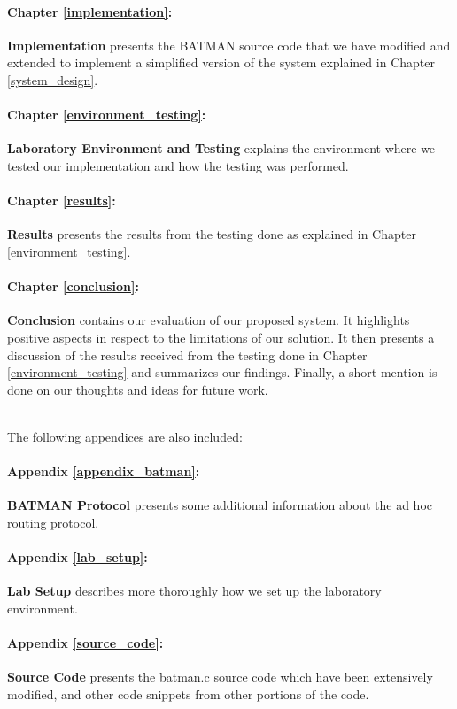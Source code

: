 \paragraph{Chapter \ref{implementation}:}\textbf{Implementation} presents the BATMAN source code that we have modified and extended to implement a simplified version of the system explained in Chapter \ref{system_design}.

\paragraph{Chapter \ref{environment_testing}:}\textbf{Laboratory Environment and Testing} explains the environment where we tested our implementation and how the testing was performed.

\paragraph{Chapter \ref{results}:}\textbf{Results} presents the results from the testing done as explained in Chapter \ref{environment_testing}.

\paragraph{Chapter \ref{conclusion}:}\textbf{Conclusion} contains our evaluation of our proposed system. It highlights positive aspects in respect to the limitations of our solution. It then presents a discussion of the results received from the testing done in Chapter \ref{environment_testing} and summarizes our findings. Finally, a short mention is done on our thoughts and ideas for future work.

\noindent
\\The following appendices are also included:

\paragraph{Appendix \ref{appendix_batman}:}\textbf{BATMAN Protocol} presents some additional information about the ad hoc routing protocol.

\paragraph{Appendix \ref{lab_setup}:}\textbf{Lab Setup} describes more thoroughly how we set up the laboratory environment.

\paragraph{Appendix \ref{source_code}:}\textbf{Source Code} presents the batman.c source code which have been extensively modified, and other code snippets from other portions of the code.

